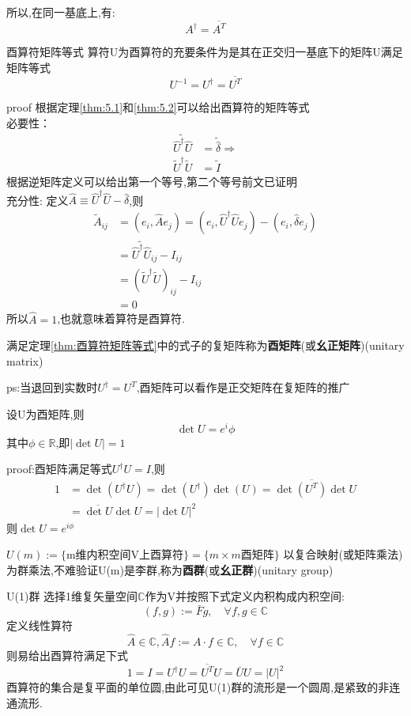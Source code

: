 \documentclass[../main.tex]{subfiles}
\begin{document}
所以,在同一基底上,有:
$$A^\dagger = \overline{A^T}$$
\begin{theorem}{}{酉算符矩阵等式}
算符U为酉算符的充要条件为是其在正交归一基底下的矩阵U满足矩阵等式
$$U^{-1} = U^\dagger = \overline{U^T}$$
\end{theorem}
proof 根据定理\ref{thm:5.1}和\ref{thm:5.2}可以给出酉算符的矩阵等式\\
必要性：
\begin{align*}
    \widetilde{\hat{U}^\dagger \hat{U}} &= \tilde{\hat{\delta}} \Rightarrow \\
    \tilde{U}^\dagger \tilde{U} &= \tilde{I}
\end{align*}
根据逆矩阵定义可以给出第一个等号,第二个等号前文已证明\\
充分性: 定义$\hat{A}\equiv \hat{U}^\dagger\hat{U} - \hat{\delta}$,则
\begin{align*}
\tilde{A}_{ij}&= (e_i,\hat{A}e_j) = (e_i, \hat{U}^\dagger\hat{U}e_j) - (e_i,\hat{\delta}e_j)\\
&=\widetilde{\hat{U}^\dagger\hat{U}}_{ij} - I_{ij}\\
&=(\tilde{U}^\dagger\tilde{U})_{ij}- I_{ij}\\
&= 0
\end{align*}
所以$\hat{A} = 1$,也就意味着算符是酉算符.
\begin{definition}
  满足定理\ref{thm:酉算符矩阵等式}中的式子的复矩阵称为\textbf{酉矩阵}(或\textbf{幺正矩阵})(unitary matrix)  
\end{definition}
ps:当退回到实数时$U^\dagger = U^T$,酉矩阵可以看作是正交矩阵在复矩阵的推广
\begin{theorem}
    设U为酉矩阵,则
    $$\det U = e^i\phi $$
    其中$\phi \in \mathbb{R}$,即$|\det U| = 1$
\end{theorem}
proof:酉矩阵满足等式$U^\dagger U = I$,则
\begin{align*}
    1 &= \det(U^\dagger U) = \det(U^\dagger)\det(U) = \det\overline{(U^T)} \det U\\
        &=\overline{\det U}\det U = |\det U|^2
\end{align*}
则$\det U = e^{i\phi}$
\begin{definition}
    $U(m) := \{\text{m维内积空间V上酉算符}\} = \{m\times m \text{酉矩阵}\}$
    以复合映射(或矩阵乘法)为群乘法,不难验证U(m)是李群,称为\textbf{酉群}(或\textbf{幺正群})(unitary group)
\end{definition}
\begin{example}{U(1)群}
\label{U(1)群}
选择1维复矢量空间$\mathbb{C}$作为V并按照下式定义内积构成内积空间:
$$(f,g):=\bar{F}g,\quad \forall f,g \in \mathbb{C}$$
定义线性算符
$$ \hat{A} \in \mathbb{C}, \hat{A}f:= A\cdot f \in \mathbb{C},\quad \forall f \in \mathbb{C}$$
则易给出酉算符满足下式
$$1 = I = U^\dagger U = \overline{U^T}U = \bar{U}{U} = |U|^2$$
酉算符的集合是复平面的单位圆,由此可见U(1)群的流形是一个圆周,是紧致的非连通流形.
\end{example}
\end{document}
